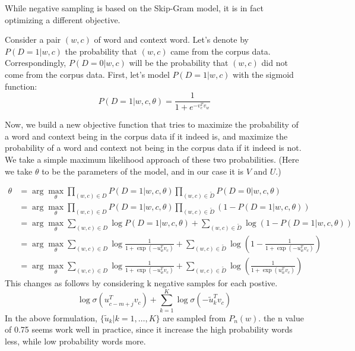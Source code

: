 \documentclass[12pt]{article}
\begin{document}
        While negative sampling is based on the Skip-Gram
        model, it is in fact optimizing a different objective.

        Consider a pair $(w, c)$ of word and context word.
        Let's denote by $P(D = 1|w, c)$ the probability that $(w, c)$ came from the corpus data. Correspondingly, $P(D = 0|w, c)$ will be the
        probability that $(w, c)$ did not come from the corpus data. First, let's model $P(D = 1|w, c)$ with the sigmoid function:
        \[P(D = 1|w, c, \theta) = \frac{1}{1 + e^{-v_c^T v_w}}\]
         
        Now, we build a new objective function that tries to maximize the probability of a word and context being in the corpus data if it indeed is, and maximize the probability of a word and context not being in the corpus data if it indeed is not. We take a simple maximum likelihood approach of these two probabilities. (Here we take $\theta$ to be the parameters of the model, and in our case it is $V$ and $U$.)

        \begin{align*}
            \theta &= \arg\max_{\theta} \prod_{(w,c) \in D} P(D = 1|w, c, \theta) \prod_{(w,c) \in \tilde{D}} P(D = 0|w, c, \theta) \\
            &= \arg\max_{\theta} \prod_{(w,c) \in D} P(D = 1|w, c, \theta) \prod_{(w,c) \in \tilde{D}} (1 - P(D = 1|w, c, \theta)) \\
            &= \arg\max_{\theta} \sum_{(w,c) \in D} \log P(D = 1|w, c, \theta) + \sum_{(w,c) \in \tilde{D}} \log(1 - P(D = 1|w, c, \theta)) \\
            &= \arg\max_{\theta} \sum_{(w,c) \in D} \log \frac{1}{1 + \exp(-u_w^T v_c)} + \sum_{(w,c) \in \tilde{D}} \log\left(1 - \frac{1}{1 + \exp(-u_w^T v_c)}\right) \\
            &= \arg\max_{\theta} \sum_{(w,c) \in D} \log \frac{1}{1 + \exp(-u_w^T v_c)} + \sum_{(w,c) \in \tilde{D}} \log\left(\frac{1}{1 + \exp(u_w^T v_c)}\right)
        \end{align*}
        This changes as follows by considering k negative samples for each postive.
        \[
            \log \sigma(u_{c-m+j}^T v_c) + \sum_{k=1}^{K} \log \sigma(-\tilde{u}_k^T v_c)
        \]
        In the above formulation, $\{\tilde{u}_k | k = 1, \ldots, K\}$ are sampled from $P_n(w)$.
        the n value of 0.75 seems work well in practice, since it increase the high probability words 
        less, while low probability words more.
\end{document}
